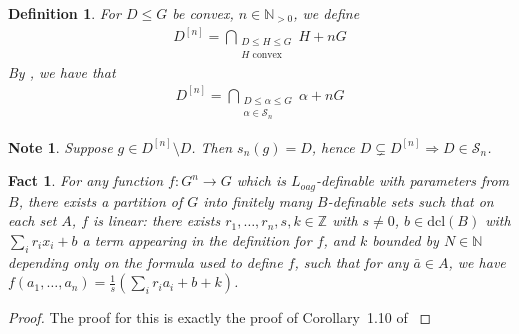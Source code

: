 \documentclass[a4paper,11pt]{article}
\newtheorem{definition}[theorem]{Definition}
\newtheorem*{note}{Note}
\newtheorem{fact}[theorem]{Fact}
\renewcommand{\implies}{\Longrightarrow}
\newcommand{\dcl}{\textrm{dcl}}
\newcommand{\tx}{\textrm}
\newcommand{\Sn}{\mathcal{S}_n}
\begin{document}
\begin{definition}\label{def D^{[n]}}
	For $D\leq G$ be convex, $n\in\mathbb{N}_{>0}$, we define
    \begin{align*}
        D^{[n]} = \bigcap\limits_{\substack{D\leq H\leq G\\ H \tx{ convex}}}H+nG
    \end{align*}
    By \cite{QE}, we have that
    \begin{align*}
        D^{[n]} = \bigcap\limits_{\substack{D\leq \alpha\leq G\\ \alpha \in\Sn}}\alpha+nG
    \end{align*}
\end{definition}
\begin{note}
	Suppose $g\in D^{[n]}\setminus D$. Then $s_n(g) = D$, hence $D \subsetneq D^{[n]}\implies D\in \Sn$.
\end{note}
\begin{fact}\label{Functions to G are linear}
	For any function $f:G^n\rightarrow G$ which is $L_{oag}$-definable with parameters from $B$, there exists a partition of $G$ into finitely many $B$-definable sets such that on each set $A$, $f$ is linear: there exists $r_1,\dots, r_n, s,k\in \mathbb{Z}$ with $s\neq 0$, $b\in\dcl(B)$ with $\sum_ir_ix_i + b$ a term appearing in the definition for $f$, and $k$ bounded by $N\in\mathbb{N}$ depending only on the formula used to define $f$, such that for any $\bar a\in A$, we have $f(a_1,\dots,a_n) = \frac{1}{s}(\sum_i r_ia_i + b+k)$.
\end{fact}
\begin{proof}
	The proof for this is exactly the proof of Corollary~1.10 of \cite{QE} %
\end{proof}
\end{document}
